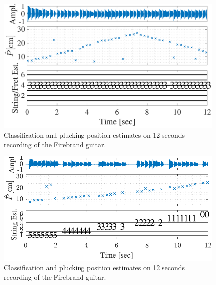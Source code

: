 \documentclass{article}
\begin{document}
%
\begin{figure}[t]
  \centering
  \centerline{\includegraphics[width=.9\columnwidth]{img/tablature_constant_note8}}\vspace{-2mm}
  \caption{Classification and plucking position estimates on 12 seconds recording of the Firebrand guitar.}\label{fig:pluck_position_fixed_tabs}
\end{figure}%
%
\begin{figure}[t]
  \centering
  \centerline{\includegraphics[width=.92\columnwidth]{img/tablature_constant_note23_LSD}}%
  \caption{Classification and plucking position estimates on 12 seconds recording of the Firebrand guitar.}\label{fig:pluck_position_varied_tabs}\vspace{-.6mm}
\end{figure} \vspace{-.8mm}
%
\end{document}
